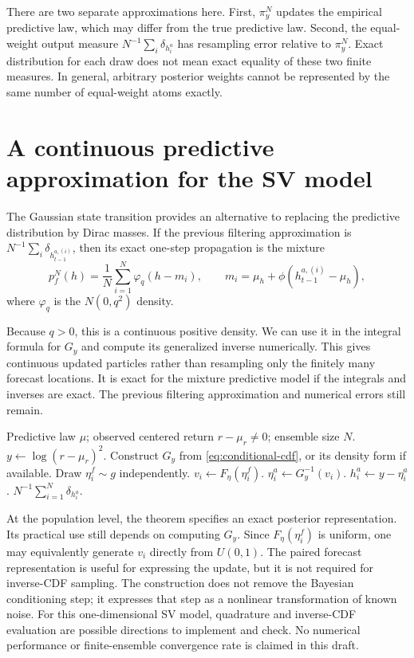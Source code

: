 \documentclass[11pt]{article}
\begin{document}
There are two separate approximations here. First, $\pi_y^N$ updates
the empirical predictive law, which may differ from the true predictive
law. Second, the equal-weight output measure
$N^{-1}\sum_i\delta_{h_i^a}$ has resampling error relative to $\pi_y^N$.
Exact distribution for each draw does not mean exact equality of
these two finite measures. In general, arbitrary posterior weights
cannot be represented by the same number of equal-weight atoms exactly.

\section{A continuous predictive approximation for the SV model}

The Gaussian state transition provides an alternative to replacing the
predictive distribution by Dirac masses. If the previous filtering
approximation is $N^{-1}\sum_i\delta_{h_{t-1}^{a,(i)}}$, then its exact
one-step propagation is the mixture
\[
p_f^N(h)=\frac1N\sum_{i=1}^N
\varphi_q(h-m_i),\qquad
m_i=\mu_h+\phi(h_{t-1}^{a,(i)}-\mu_h),
\]
where $\varphi_q$ is the $N(0,q^2)$ density.

Because $q>0$, this is a continuous positive density. We can use it in
the integral formula for $G_y$ and compute its generalized inverse
numerically. This gives continuous updated particles rather than
resampling only the finitely many forecast locations. It is exact for
the mixture predictive model if the integrals and inverses are exact.
The previous filtering approximation and numerical errors still remain.

\begin{algorithm}[htbp]
\caption{One-step noise-transport update}
\begin{algorithmic}[1]
\Require Predictive law $\mu$; observed centered return $r-\mu_r\ne0$;
ensemble size $N$.
\State $y\gets\log(r-\mu_r)^2$.
\State Construct $G_y$ from \eqref{eq:conditional-cdf}, or its
density form if available.
    \State Draw $\eta_i^f\sim g$ independently.
    \State $v_i\gets F_\eta(\eta_i^f)$.
    \State $\eta_i^a\gets G_y^{-1}(v_i)$.
    \State $h_i^a\gets y-\eta_i^a$.
\EndFor
\State \Return $N^{-1}\sum_{i=1}^N\delta_{h_i^a}$.
\end{algorithmic}
\end{algorithm}

At the population level, the theorem specifies an exact posterior
representation. Its practical use still depends on computing $G_y$.
Since $F_\eta(\eta_i^f)$ is uniform, one may equivalently generate
$v_i$ directly from $U(0,1)$. The paired forecast representation is useful
for expressing the update, but it is not required for inverse-CDF sampling.
The construction does not remove the Bayesian conditioning step; it
expresses that step as a nonlinear transformation of known noise.
For this one-dimensional SV model, quadrature and inverse-CDF evaluation
are possible directions to implement and check. No numerical performance
or finite-ensemble convergence rate is claimed in this draft.
\end{document}
